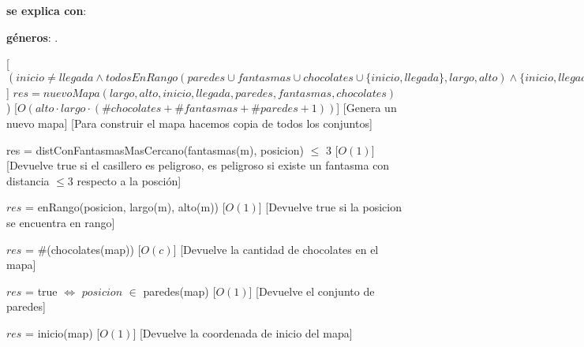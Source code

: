 \documentclass{book}
\begin{document}
    \pagestyle{plain}

    \begin{Interfaz}

        \textbf{se explica con}: 

        \textbf{géneros}: .


            [$(inicio \neq llegada \wedge todosEnRango(paredes \cup fantasmas \cup chocolates \cup \{inicio, llegada\}, largo, alto) \wedge \{inicio, llegada\} \cap (fantasmas \cup paredes) = \emptyset \wedge disjuntosDeAPares(paredes, fantasmas, chocolates))$]
            {$ res = nuevoMapa(largo, alto,inicio,llegada,paredes,fantasmas,chocolates)$ )}%
            [$O(alto \cdot largo \cdot (\#chocolates + \#fantasmas + \#paredes + 1))$]
            [Genera un nuevo mapa]
            [Para construir el mapa hacemos copia de todos los conjuntos]

            { res = distConFantasmasMasCercano(fantasmas(m), posicion) $\leq$ 3 }%
            [$O(1)$]
            [Devuelve true si el casillero es peligroso, es peligroso si existe un fantasma con distancia $\leq 3$ respecto a la posción]

            {$res$ = enRango(posicion, largo(m), alto(m))}%
            [$O(1)$]
            [Devuelve true si la posicion se encuentra en rango]

            {$res$ = \#(chocolates(map))}%
            [$O(c)$]
            [Devuelve la cantidad de chocolates en el mapa]

            {$res$ = true $\iff$ $posicion$ $\in$ paredes(map)}%
            [$O(1)$]
            [Devuelve el conjunto de paredes]

            {$res$ = inicio(map)}%
            [$O(1)$]
            [Devuelve la coordenada de inicio del mapa]


\end{Interfaz}
\end{document}
